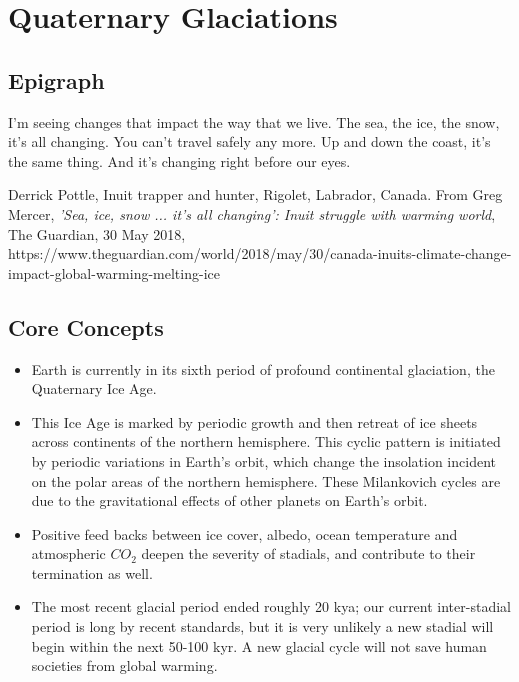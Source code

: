\chapter{Quaternary Glaciations} \label{The Ice_Ages}
\section{Epigraph} \label{Ice_AgesEpigraph}
\epigraph{I'm seeing changes that impact the way that we live. The sea, the ice, the snow, it's all changing. You can't travel safely any more. Up and down the coast, it's the same thing. And it's changing right before our eyes.}{Derrick Pottle, Inuit trapper and hunter, Rigolet, Labrador, Canada. From Greg Mercer, \textit{'Sea, ice, snow ... it's all changing': Inuit struggle with warming world}, The Guardian, 30 May 2018, https://www.theguardian.com/world/2018/may/30/canada-inuits-climate-change-impact-global-warming-melting-ice } 

\section{Core Concepts} \label{Ice_Ages_Core Concepts}
\begin{itemize}
	\item	Earth is currently in its sixth period of profound continental glaciation, the Quaternary Ice Age.  
	\item This Ice Age is marked by periodic growth and then retreat of ice sheets across continents of the northern hemisphere. This cyclic pattern is initiated by periodic variations in Earth's orbit, which change the insolation incident on the polar areas of the northern hemisphere. These Milankovich cycles are due to the gravitational effects of other planets on Earth's orbit.
	\item Positive feed backs between ice cover, albedo, ocean temperature and atmospheric $CO_2$ deepen the severity of stadials, and contribute to their termination as well. 
	\item The most recent glacial period ended roughly 20 kya; our current inter-stadial period is long by recent standards, but it is very unlikely a new stadial will begin within the next 50-100 kyr. A new glacial cycle will not save human societies from global warming. 
\end{itemize}

